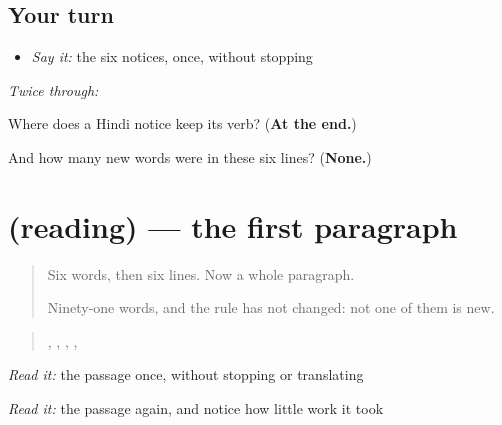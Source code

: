 \subsection*{Your turn}
\begin{itemize}
\raggedright
  \item \emph{Say it:} the six notices, once, without stopping
\end{itemize}

\emph{Twice through:}

\begin{tcolorbox}[breakable,colback=teal!4,colframe=teal!35!black,title={Before you move on}]
Where does a Hindi notice keep its verb? (\textbf{At the end.})

And how many new words were in these six lines? (\textbf{None.})
\end{tcolorbox}
\section[(reading)]{(reading) — the first paragraph}

\label{lesson:HI-C78-pehla-paath}



\begin{quote}
Six words, then six lines. Now a whole paragraph.

Ninety-one words, and the rule has not changed: not one of them is new.
\end{quote}

\begin{tcolorbox}[breakable,skin=enhanced,colback=orange!6,colframe=orange!45!black,boxrule=0.5pt,arc=1mm,left=6pt,right=6pt,top=4pt,bottom=4pt,fonttitle=\bfseries,title={Read this}]
\begin{quote}
            ,       ,                       ,                            ,                    
\end{quote}

\emph{Read it:} the passage once, without stopping or translating

\emph{Read it:} the passage again, and notice how little work it took
\end{tcolorbox}

